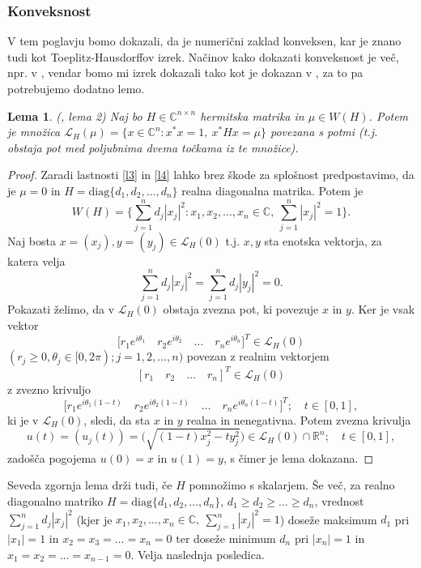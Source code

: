 \documentclass[12pt,a4paper]{amsart}
\theoremstyle{definition}
\theoremstyle{plain}
\newtheorem{lema}[definicija]{Lema}
\newcommand{\LH}{\mathcal{L}}
\newcommand{\R}{\mathbb R}
\newcommand{\C}{\mathbb C}
\begin{document}
\subsubsection{Konveksnost}
V tem poglavju bomo dokazali, da je numerični zaklad konveksen, kar je znano tudi kot Toeplitz-Hausdorffov izrek. 
Načinov kako dokazati konveksnost je več, npr. v \cite{num}, vendar bomo mi izrek dokazali tako kot je dokazan v \cite{zaloga}, za to pa potrebujemo dodatno lemo. 
\begin{lema}(\cite{zaloga}, lema 2)
Naj bo $H\in \C^{n\times n}$ hermitska matrika in $\mu \in W(H)$. Potem je množica $\LH _{H}(\mu)=\{x\in \C^n \! : x^\ast x=1,\ x^\ast Hx=\mu\}$ povezana s potmi (t.j. obstaja pot med poljubnima dvema točkama iz te množice).%
\end{lema}

\begin{proof}
Zaradi lastnosti \ref{l3} in \ref{l4} lahko brez škode za splošnost predpostavimo, da je $\mu=0$ in $H=\text{diag}\{d_1,d_2,\dots,d_n\}$ realna diagonalna matrika.
Potem je 
$$W(H)=\Big\{ \sum_{j=1}^{n} d_j|x_j|^2: x_1,x_2,\dots,x_n \in \C,\ \sum_{j=1}^{n} |x_j|^2=1\Big \}.$$
Naj bosta $x=(x_j), y=(y_j)\in \LH_{H}(0)$ t.j. $x,y$ sta enotska vektorja, za katera velja 
$$\sum_{j=1}^{n} d_j|x_j|^2=\sum_{j=1}^{n} d_j|y_j|^2=0.$$
 Pokazati želimo, da v $\LH_{H}(0)$ obstaja zvezna pot, ki povezuje $x$ in $y$. Ker je vsak vektor 
$$\Big[r_1 e^{i\theta_1}\quad  r_2 e^{i\theta_2}\quad  \dots\quad r_n e^{i\theta_n}\Big]^T \in \LH_{H}(0)$$  
$(r_j \geq 0, \theta_j\in [0, 2\pi); j=1,2,\dots,n)$ povezan z realnim vektorjem 
$$[r_1 \quad r_2 \quad \dots \quad r_n]^T \in \LH_{H}(0)$$
 z zvezno krivuljo
$$\Big[r_1 e^{i\theta_1(1-t)}\quad  r_2 e^{i\theta_2(1-t)}\quad  \dots\quad  r_n e^{i\theta_n(1-t)}\Big]^T; \quad t\in[0,1],$$
ki je v $\LH_{H}(0)$, sledi, da sta $x$ in $y$ realna in nenegativna. Potem zvezna krivulja
$$u(t)=(u_j(t))=\Big(\sqrt{(1-t)x^2_j -ty^2_j}\Big) \in \LH_{H}(0)\cap \R^n ; \quad t\in [0,1],$$
zadošča pogojema $u (0)=x$ in $u (1) =y$, s čimer je lema dokazana.
\end{proof}

Seveda zgornja lema drži tudi, če $H$ pomnožimo s skalarjem. Še več, za realno diagonalno matriko $H=\text{diag}\{d_1,d_2,\dots,d_n\}$, $d_1\geq d_2\geq \dots \geq d_n$, vrednost $\sum_{j=1}^{n} d_j|x_j|^2$ 
(kjer je $x_1,x_2,\dots, x_n \in \C,\ \sum_{j=1}^{n}|x_j|^2 =1$) doseže maksimum $d_1$ pri $|x_1|=1$ in $x_2=x_3=\dots=x_n=0$ ter doseže minimum $d_n$ pri $|x_n|=1$ in $x_1=x_2=\dots=x_{n-1}=0$. Velja naslednja posledica.
\end{document}
